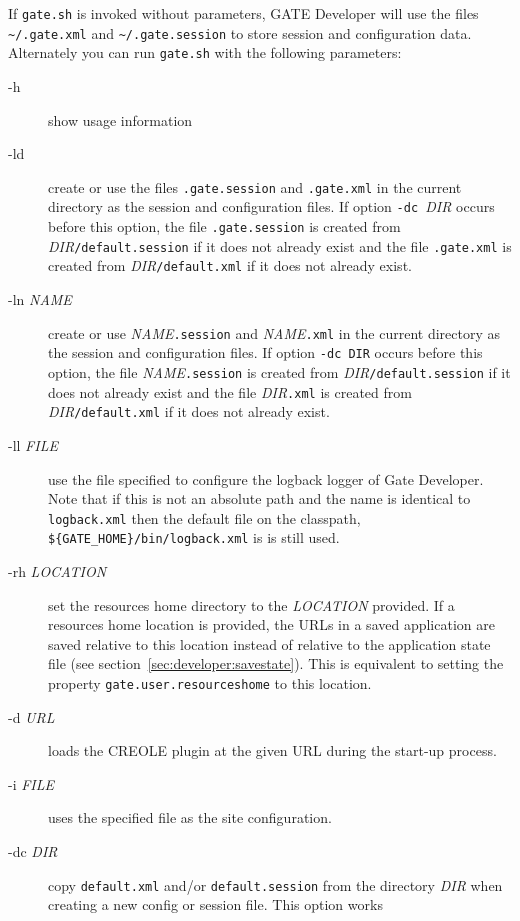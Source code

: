 If \verb|gate.sh| is invoked without parameters, GATE Developer will use the 
files \verb|~/.gate.xml| and \verb|~/.gate.session| to store session and 
configuration data. Alternately you can run \verb|gate.sh| with the 
following parameters:
\begin{description}
  \item[-h] show usage information
  \item[-ld] create or use the files \texttt{.gate.session} and 
     \texttt{.gate.xml} in the current directory as the session and
     configuration files. If option \texttt{-dc }\emph{DIR} occurs before this option,
     the file \texttt{.gate.session} is created from \emph{DIR}\texttt{/default.session}
     if it does not already exist and the file \texttt{.gate.xml} is created 
     from \emph{DIR}\texttt{/default.xml} if it does not already exist.
  \item[-ln \emph{NAME}] create or use \emph{NAME}\texttt{.session} and
    \emph{NAME}\texttt{.xml} in the current directory as the session and 
    configuration files. If option \texttt{-dc DIR} occurs before this option,
     the file \emph{NAME}\texttt{.session} is created from \emph{DIR}\texttt{/default.session}
     if it does not already exist and the file \emph{DIR}\texttt{.xml} is created 
     from \emph{DIR}\texttt{/default.xml} if it does not already exist.
  \item[-ll \emph{FILE}] use the file specified to configure the logback logger of Gate Developer.
    Note that if this is not an absolute path and the name is identical to \texttt{logback.xml}
    then the default file on the classpath, \verb|${GATE_HOME}/bin/logback.xml| is is still used. 
  \item[-rh \emph{LOCATION}] set the resources home directory to the \emph{LOCATION} provided. 
    If a resources home location is provided, the URLs in a saved application are
    saved relative to this location instead of relative to the application state file
    (see section~\ref{sec:developer:savestate}).
    This is equivalent to setting the property \texttt{gate.user.resourceshome} to
    this location.
  \item[-d \emph{URL}] loads the CREOLE plugin at the given URL during the
  start-up process.
  \item[-i \emph{FILE}] uses the specified file as the site configuration.
  \item[-dc \emph{DIR}] copy \texttt{default.xml} and/or \texttt{default.session} 
    from the directory \emph{DIR} when creating a new config or session file. This option works

\end{description}

